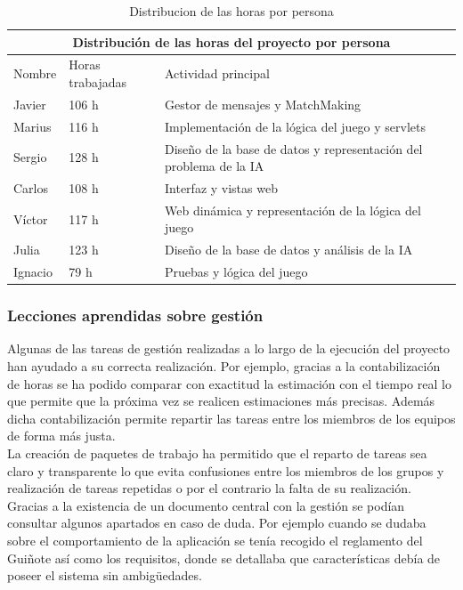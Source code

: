 \begin{table}[htb]
\centering
\begin{tabular}{|l|l|l|}
\hline
\multicolumn{3}{|c|}{Distribución de las horas del proyecto por persona} \\ \hline
	Nombre & Horas trabajadas & Actividad principal \\ \hline
	Javier & 106 h & Gestor de mensajes y MatchMaking \\ \hline
	Marius & 116 h & Implementación de la lógica del juego y servlets \\ \hline
	Sergio & 128 h & Diseño de la base de datos y representación del problema de la IA \\ \hline
	Carlos & 108 h & Interfaz y vistas web \\ \hline
	Víctor & 117 h & Web dinámica y representación de la lógica del juego \\ \hline
	Julia  & 123 h & Diseño de la base de datos y análisis de la IA \\ \hline
	Ignacio & 79 h & Pruebas y lógica del juego \\ \hline
 \end{tabular}
 \caption{Distribucion de las horas por persona}
\label{}
\end{table}

\subsubsection{Lecciones aprendidas sobre gestión}
Algunas de las tareas de gestión realizadas a lo largo de la ejecución del proyecto han ayudado a su correcta realización. Por ejemplo, gracias a la contabilización de horas se ha podido comparar con exactitud la estimación con el tiempo real lo que permite que la próxima vez se realicen estimaciones más precisas. Además dicha contabilización permite repartir las tareas entre los miembros de los equipos de forma más justa.\\

La creación de paquetes de trabajo ha permitido que el reparto de tareas sea claro y transparente lo que evita confusiones entre los miembros de los grupos y realización de tareas repetidas o por el contrario la falta de su realización.\\

Gracias a la existencia de un documento central con la gestión se podían consultar algunos apartados en caso de duda. Por ejemplo cuando se dudaba sobre el comportamiento de la aplicación se tenía recogido el reglamento del Guiñote así como los requisitos, donde se detallaba que características debía de poseer el sistema sin ambigüedades.\\

